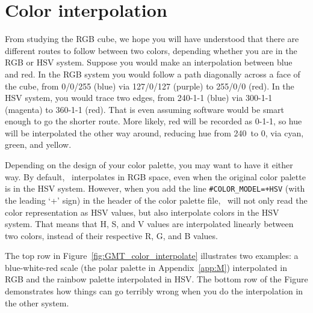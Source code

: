 \section{Color interpolation}
From studying the RGB cube, we hope you will have understood that there are different routes to follow between two colors, depending whether you are in the RGB or HSV system. Suppose you would make an interpolation between blue and red. In the RGB system you would follow a path diagonally across a face of the cube, from 0/0/255 (blue) via 127/0/127 (purple) to 255/0/0 (red). In the HSV system, you would trace two edges, from 240-1-1 (blue) via 300-1-1 (magenta) to 360-1-1 (red). That is even assuming software would be smart enough to go the shorter route. More likely, red will be recorded as 0-1-1, so hue will be interpolated the other way around, reducing hue from 240\DS\ to 0\DS, via cyan, green, and yellow.

Depending on the design of your color palette, you may want to have it either way. By default, \GMT\ interpolates in RGB space, even when the original color palette is in the HSV system. However, when you add the line \texttt{\#COLOR\_MODEL=+HSV} (with the leading `+' sign) in the header of the color palette file, \GMT\ will not only read the color representation as HSV values, but also interpolate colors in the HSV system. That means that H, S, and V values are interpolated linearly between two colors, instead of their respective R, G, and B values.

The top row in Figure~\ref{fig:GMT_color_interpolate} illustrates two examples: a blue-white-red scale (the \textsf{polar} palette in Appendix~\ref{app:M}) interpolated in RGB and the \textsf{rainbow} palette interpolated in HSV. The bottom row of the Figure demonstrates how things can go terribly wrong when you do the interpolation in the other system.

